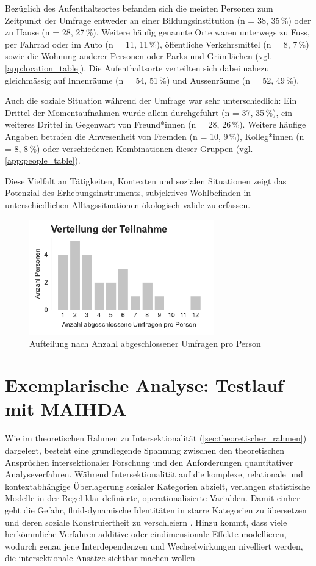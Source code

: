 Bezüglich des Aufenthaltsortes befanden sich die meisten Personen zum Zeitpunkt der Umfrage entweder an einer Bildungsinstitution (n = 38, 35\,\%) oder zu Hause (n = 28, 27\,\%). Weitere häufig genannte Orte waren unterwegs zu Fuss, per Fahrrad oder im Auto (n = 11, 11\,\%), öffentliche Verkehrsmittel (n = 8, 7\,\%) sowie die Wohnung anderer Personen oder Parks und Grünflächen (vgl. \cref{app:location_table}). Die Aufenthaltsorte verteilten sich dabei nahezu gleichmässig auf Innenräume (n = 54, 51\,\%) und Aussenräume (n = 52, 49\,\%).

Auch die soziale Situation während der Umfrage war sehr unterschiedlich: Ein Drittel der Momentaufnahmen wurde allein durchgeführt (n = 37, 35\,\%), ein weiteres Drittel in Gegenwart von Freund*innen (n = 28, 26\,\%). Weitere häufige Angaben betrafen die Anwesenheit von Fremden (n = 10, 9\,\%), Kolleg*innen (n = 8, 8\,\%) oder verschiedenen Kombinationen dieser Gruppen (vgl. \cref{app:people_table}).

Diese Vielfalt an Tätigkeiten, Kontexten und sozialen Situationen zeigt das Potenzial des Erhebungsinstruments, subjektives Wohlbefinden in unterschiedlichen Alltagssituationen ökologisch valide zu erfassen.

\begin{figure}[htbp]
    \centering
    \includegraphics[width=8cm]{analysis/plots/survey_counts.pdf}
    \caption{Aufteilung nach Anzahl abgeschlossener Umfragen pro Person}
    \label{fig:survey_counts}
\end{figure}

\section{Exemplarische Analyse: Testlauf mit MAIHDA}

Wie im theoretischen Rahmen zu Intersektionalität (\cref{sec:theoretischer_rahmen}) dargelegt, besteht eine grundlegende Spannung zwischen den theoretischen Ansprüchen intersektionaler Forschung und den Anforderungen quantitativer Analyseverfahren. Während Intersektionalität auf die komplexe, relationale und kontextabhängige Überlagerung sozialer Kategorien abzielt, verlangen statistische Modelle in der Regel klar definierte, operationalisierte Variablen. Damit einher geht die Gefahr, fluid-dynamische Identitäten in starre Kategorien zu übersetzen und deren soziale Konstruiertheit zu verschleiern \parencite{hancockWhenMultiplicationDoesnt2007, bowlegInvitedReflectionQuantifying2016}. Hinzu kommt, dass viele herkömmliche Verfahren additive oder eindimensionale Effekte modellieren, wodurch genau jene Interdependenzen und Wechselwirkungen nivelliert werden, die intersektionale Ansätze sichtbar machen wollen \parencite{scottIntersectionalityQuantitativeMethods2017}.

